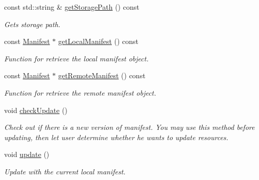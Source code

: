 \begin{DoxyCompactItemize}
const std\+::string \& \hyperlink{classAssetsManagerEx_af80e1a94a8c5c90958d53d90c573d159}{get\+Storage\+Path} () const
\begin{DoxyCompactList}\small\item\em Gets storage path. \end{DoxyCompactList}\item 
\mbox{\label{classAssetsManagerEx_afd73c9bbb62eba989ae27c80f9d1731d}} 
const \hyperlink{classManifest}{Manifest} $\ast$ \hyperlink{classAssetsManagerEx_afd73c9bbb62eba989ae27c80f9d1731d}{get\+Local\+Manifest} () const
\begin{DoxyCompactList}\small\item\em Function for retrieve the local manifest object. \end{DoxyCompactList}\item 
\mbox{\label{classAssetsManagerEx_a30f06b99728086d1ea5b7a8dac550fcb}} 
const \hyperlink{classManifest}{Manifest} $\ast$ \hyperlink{classAssetsManagerEx_a30f06b99728086d1ea5b7a8dac550fcb}{get\+Remote\+Manifest} () const
\begin{DoxyCompactList}\small\item\em Function for retrieve the remote manifest object. \end{DoxyCompactList}\item 
\mbox{\label{classAssetsManagerEx_a6f9f8da1b4719cf6a8a0482ef50bfe0f}} 
void \hyperlink{classAssetsManagerEx_a6f9f8da1b4719cf6a8a0482ef50bfe0f}{check\+Update} ()
\begin{DoxyCompactList}\small\item\em Check out if there is a new version of manifest. You may use this method before updating, then let user determine whether he wants to update resources. \end{DoxyCompactList}\item 
\mbox{\label{classAssetsManagerEx_a4e45b523a7f2d546f6f4bfe57401dcbf}} 
void \hyperlink{classAssetsManagerEx_a4e45b523a7f2d546f6f4bfe57401dcbf}{update} ()
\begin{DoxyCompactList}\small\item\em Update with the current local manifest. \end{DoxyCompactList}\item 
\mbox{\label{classAssetsManagerEx_a7e88b604c6cb16e3382ee7126339966c}} 

\end{DoxyCompactItemize}
